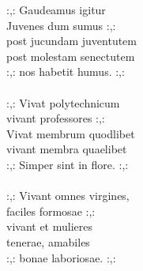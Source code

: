 
:,: Gaudeamus igitur \\ Juvenes dum sumus :,: \\ post jucundam juventutem \\ post molestam senectutem \\ :,: nos habetit humus. :,: \\ \hspace{10mm} \\ :,: Vivat polytechnicum \\ vivant professores :,: \\ Vivat membrum quodlibet \\ vivant membra quaelibet \\ :,: Simper sint in flore. :,: \\ \hspace{10mm} \\ :,: Vivant omnes virgines, \\ faciles formosae :,: \\ vivant et mulieres \\ tenerae, amabiles \\ :,: bonae laboriosae. :,: